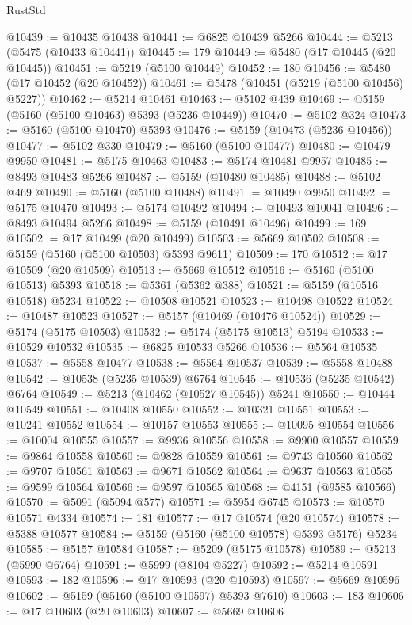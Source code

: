 \begin{lexlean}{RustStd}
\begin{coremodule}
@10439 := @10435 @10438
@10441 := @6825 @10439 @5266
@10444 := @5213 (@5475 (@10433 @10441))
@10445 := 179
@10449 := @5480 (@17 @10445 (@20 @10445))
@10451 := @5219 (@5100 @10449)
@10452 := 180
@10456 := @5480 (@17 @10452 (@20 @10452))
@10461 := @5478 (@10451 (@5219 (@5100 @10456) @5227))
@10462 := @5214 @10461
@10463 := @5102 @439
@10469 := @5159 (@5160 (@5100 @10463) @5393 (@5236 @10449))
@10470 := @5102 @324
@10473 := @5160 (@5100 @10470) @5393
@10476 := @5159 (@10473 (@5236 @10456))
@10477 := @5102 @330
@10479 := @5160 (@5100 @10477)
@10480 := @10479 @9950
@10481 := @5175 @10463
@10483 := @5174 @10481 @9957
@10485 := @8493 @10483 @5266
@10487 := @5159 (@10480 @10485)
@10488 := @5102 @469
@10490 := @5160 (@5100 @10488)
@10491 := @10490 @9950
@10492 := @5175 @10470
@10493 := @5174 @10492
@10494 := @10493 @10041
@10496 := @8493 @10494 @5266
@10498 := @5159 (@10491 @10496)
@10499 := 169
@10502 := @17 @10499 (@20 @10499)
@10503 := @5669 @10502
@10508 := @5159 (@5160 (@5100 @10503) @5393 @9611)
@10509 := 170
@10512 := @17 @10509 (@20 @10509)
@10513 := @5669 @10512
@10516 := @5160 (@5100 @10513) @5393
@10518 := @5361 (@5362 @388)
@10521 := @5159 (@10516 @10518) @5234
@10522 := @10508 @10521
@10523 := @10498 @10522
@10524 := @10487 @10523
@10527 := @5157 (@10469 (@10476 @10524))
@10529 := @5174 (@5175 @10503)
@10532 := @5174 (@5175 @10513) @5194
@10533 := @10529 @10532
@10535 := @6825 @10533 @5266
@10536 := @5564 @10535
@10537 := @5558 @10477
@10538 := @5564 @10537
@10539 := @5558 @10488
@10542 := @10538 (@5235 @10539) @6764
@10545 := @10536 (@5235 @10542) @6764
@10549 := @5213 (@10462 (@10527 @10545)) @5241
@10550 := @10444 @10549
@10551 := @10408 @10550
@10552 := @10321 @10551
@10553 := @10241 @10552
@10554 := @10157 @10553
@10555 := @10095 @10554
@10556 := @10004 @10555
@10557 := @9936 @10556
@10558 := @9900 @10557
@10559 := @9864 @10558
@10560 := @9828 @10559
@10561 := @9743 @10560
@10562 := @9707 @10561
@10563 := @9671 @10562
@10564 := @9637 @10563
@10565 := @9599 @10564
@10566 := @9597 @10565
@10568 := @4151 (@9585 @10566)
@10570 := @5091 (@5094 @577)
@10571 := @5954 @6745
@10573 := @10570 @10571 @4334
@10574 := 181
@10577 := @17 @10574 (@20 @10574)
@10578 := @5388 @10577
@10584 := @5159 (@5160 (@5100 @10578) @5393 @5176) @5234
@10585 := @5157 @10584
@10587 := @5209 (@5175 @10578)
@10589 := @5213 (@5990 @6764)
@10591 := @5999 (@8104 @5227)
@10592 := @5214 @10591
@10593 := 182
@10596 := @17 @10593 (@20 @10593)
@10597 := @5669 @10596
@10602 := @5159 (@5160 (@5100 @10597) @5393 @7610)
@10603 := 183
@10606 := @17 @10603 (@20 @10603)
@10607 := @5669 @10606

\end{coremodule}
\end{lexlean}
